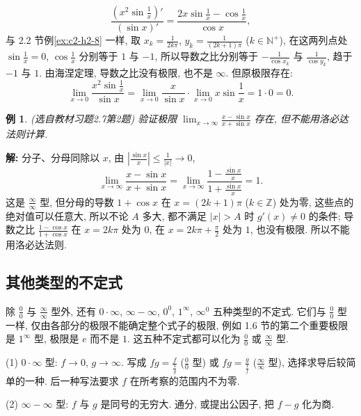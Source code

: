 \documentclass[UTF8,openany]{ctexbook}
\theoremstyle{chinesetextbook}
\newtheorem{example}{例}[section]
\newenvironment{cnsolution}{\par\indent\textbf{解:} \ignorespaces}{\par}
\begin{document}
\[
\frac{\left(x^2\sin\frac1x\right)'}{(\sin x)'}=\frac{2x\sin\frac1x-\cos\frac1x}{\cos x},
\]
与 2.2 节例\ref{ex:c2-h2-8} 一样, 取 $\displaystyle x_k=\frac1{2k\pi}$, $\displaystyle y_k=\frac1{(2k+1)\pi}$ ($k\in\mathbb N^+$), 在这两列点处 $\displaystyle\sin\frac1x=0$, $\displaystyle\cos\frac1x$ 分别等于 $1$ 与 $-1$, 所以导数之比分别等于 $\displaystyle-\frac1{\cos x_k}$ 与 $\displaystyle\frac1{\cos y_k}$, 趋于 $-1$ 与 $1$. 由海涅定理, 导数之比没有极限, 也不是 $\infty$. 但原极限存在:
\[
\lim_{x\to0}\frac{x^2\sin\frac1x}{\sin x}=\lim_{x\to0}\frac x{\sin x}\cdot\lim_{x\to0}x\sin\frac1x=1\cdot0=0.
\]
\begin{example}\label{ex:c2-h7-2}
\textnormal{(选自教材习题2.7第2题)} 验证极限 $\displaystyle\lim_{x\to\infty}\frac{x-\sin x}{x+\sin x}$ 存在, 但不能用洛必达法则计算.
\end{example}
\begin{cnsolution}
分子、分母同除以 $x$, 由 $\displaystyle\left|\frac{\sin x}x\right|\le\frac1{|x|}\to0$,
\[
\lim_{x\to\infty}\frac{x-\sin x}{x+\sin x}=\lim_{x\to\infty}\frac{1-\frac{\sin x}x}{1+\frac{\sin x}x}=1.
\]
这是 $\displaystyle\frac\infty\infty$ 型, 但分母的导数 $1+\cos x$ 在 $x=(2k+1)\pi$ ($k\in\mathbb Z$) 处为零, 这些点的绝对值可以任意大, 所以不论 $A$ 多大, 都不满足 $|x|>A$ 时 $g'(x)\ne0$ 的条件; 导数之比 $\displaystyle\frac{1-\cos x}{1+\cos x}$ 在 $x=2k\pi$ 处为 $0$, 在 $\displaystyle x=2k\pi+\frac\pi2$ 处为 $1$, 也没有极限. 所以不能用洛必达法则.
\end{cnsolution}
\subsection{其他类型的不定式}
除 $\displaystyle\frac00$ 与 $\displaystyle\frac\infty\infty$ 型外, 还有 $0\cdot\infty$, $\infty-\infty$, $0^0$, $1^\infty$, $\infty^0$ 五种类型的不定式. 它们与 $\displaystyle\frac00$ 型一样, 仅由各部分的极限不能确定整个式子的极限, 例如 1.6 节的第二个重要极限是 $1^\infty$ 型, 极限是 $e$ 而不是 $1$. 这五种不定式都可以化为 $\displaystyle\frac00$ 或 $\displaystyle\frac\infty\infty$ 型.

(1) $0\cdot\infty$ 型: $f\to0$, $g\to\infty$. 写成 $\displaystyle fg=\frac f{\frac1g}$ ($\displaystyle\frac00$ 型) 或 $\displaystyle fg=\frac g{\frac1f}$ ($\displaystyle\frac\infty\infty$ 型), 选择求导后较简单的一种. 后一种写法要求 $f$ 在所考察的范围内不为零.

(2) $\infty-\infty$ 型: $f$ 与 $g$ 是同号的无穷大. 通分, 或提出公因子, 把 $f-g$ 化为商.
\end{document}
